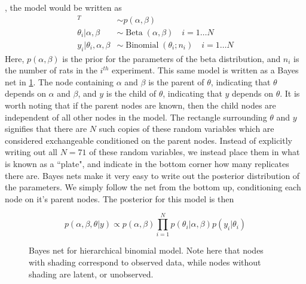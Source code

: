 , the model would be written as 
%
\begin{align*}
	[\alpha,\beta]^T &\sim p(\alpha, \beta) \\
	\theta_i \vert \alpha, \beta &\sim \operatorname{Beta}(\alpha,\beta) \quad i = 1 \dots N\\
	y_i \vert \theta_i, \alpha, \beta &\sim \operatorname{Binomial}(\theta_i ; n_i) \quad i = 1 \dots N
	\end{align*}
%
Here, $ p(\alpha, \beta)  $ is the prior for the parameters of the beta distribution, and $ n_i $ is the number of rats in the $ i^{th} $ experiment.  This same model is written as a Bayes net in \cref{bayesnet}.   The node containing $ \alpha $ and $ \beta $ is the parent of $ \theta $, indicating that $ \theta $ depends on $ \alpha $ and $ \beta $, and $ y $ is the child of $ \theta $, indicating that $ y $ depends on $ \theta $. It is worth noting that if the parent nodes are known, then the child nodes are independent of all other nodes in the model. The rectangle surrounding $ \theta $ and $ y $ signifies that there are $ N $ such copies of these random variables which are considered exchangeable conditioned on the parent nodes.  Instead of explicitly writing out all $ N=71 $ of these random variables, we instead place them in what is known as a ``plate", and indicate in the bottom corner how many replicates there are.  Bayes nets make it very easy to write out the posterior distribution of the parameters.  We simply follow the net from the bottom up, conditioning each node on it's parent nodes.  The posterior for this model is then

 \[ p(\alpha,\beta, \theta \vert y) \propto p(\alpha,\beta) \prod_{i = 1}^N p(\theta_i \vert \alpha, \beta) p(y_i\vert \theta_i)  \]

\begin{figure}[h!]

	\centering
	\caption[Hierarchical binomial model bayes net]{Bayes net for hierarchical binomial model.  Note here that nodes with shading correspond to observed data, while nodes without shading are latent, or unobserved.}
	\label{bayesnet}
\end{figure}

